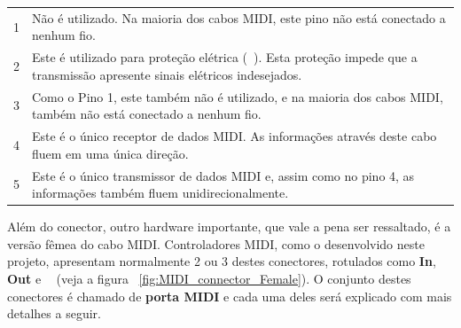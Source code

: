             \begin{center}
                \tablelasttail{\hline}
                \begin{supertabular}{| C{0.8cm} | C{14.3cm} |}
                     1 &  Não é utilizado. Na maioria dos cabos MIDI, este pino não está conectado a nenhum fio. \\
                        2 &  Este é utilizado para proteção elétrica (~). Esta proteção impede que a transmissão apresente sinais elétricos indesejados. \\
                     3 &  Como o Pino 1, este também não é utilizado, e na maioria dos cabos MIDI, também não está conectado a nenhum fio. \\
                        4 &  Este é o único receptor de dados MIDI. As informações através deste cabo fluem em uma única direção. \\
                     5 &  Este é o único transmissor de dados MIDI e, assim como no pino 4, as informações também fluem unidirecionalmente. \\
                \end{supertabular}
            \end{center}

            Além do conector, outro hardware importante, que vale a pena ser ressaltado, é a versão fêmea do cabo MIDI. Controladores MIDI, como o desenvolvido neste projeto, apresentam normalmente 2 ou 3 destes conectores, rotulados como \textbf{In}, \textbf{Out} e \textbf{~} (veja a figura ~\ref{fig:MIDI_connector_Female}). O conjunto destes conectores é chamado de \textbf{porta MIDI} e cada uma deles será explicado com mais detalhes a seguir.

